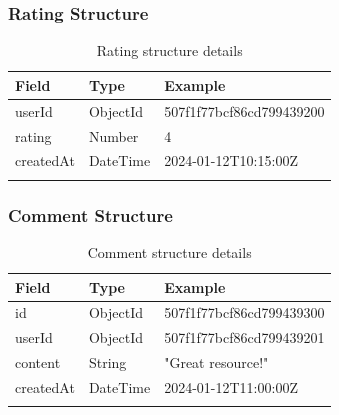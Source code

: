 \subsubsection{Rating Structure}
\begin{longtable}{|C{2.5cm}|C{1.8cm}|C{5cm}|}
\hline
\textbf{Field} & \textbf{Type} & \textbf{Example} \\ \hline
\endhead

userId & ObjectId & 507f1f77bcf86cd799439200 \\ \hline
rating & Number & 4 \\ \hline
createdAt & DateTime & 2024-01-12T10:15:00Z \\ \hline

\caption{Rating structure details}
\label{tab:rating_struct}
\end{longtable}

\subsubsection{Comment Structure}
\begin{longtable}{|C{2.5cm}|C{1.8cm}|C{5cm}|}
\hline
\textbf{Field} & \textbf{Type} & \textbf{Example} \\ \hline
\endhead

id & ObjectId & 507f1f77bcf86cd799439300 \\ \hline
userId & ObjectId & 507f1f77bcf86cd799439201 \\ \hline
content & String & "Great resource!" \\ \hline
createdAt & DateTime & 2024-01-12T11:00:00Z \\ \hline

\caption{Comment structure details}
\label{tab:comment_struct}
\end{longtable}

